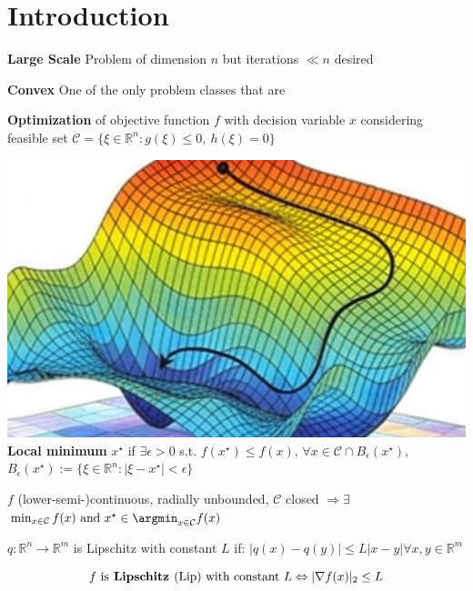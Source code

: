\section{Introduction}

\textbf{Large Scale}
Problem of dimension $n$ but iterations $\ll n$ desired

\textbf{Convex}
One of the only problem classes that are 

\textbf{Optimization}
of objective function $f$ with decision variable $x$
considering feasible set $\mathcal{C} = \{\xi \in \mathbb{R}^{n}: g(\xi)\le0,\ h(\xi)=0\}$

\includegraphics[width=\columnwidth]{images/head-image.jpg}
\textbf{Local minimum}
$x^\star$ if $\exists\epsilon>0$ s.t. $f(x^\star)\leq f(x)$,
$\forall x \in \mathcal{C} \cap B_\epsilon(x^\star)$,
$B_\epsilon(x^\star):=\{\xi\in\mathbb{R}^{n}:|\xi-x^\star|<\epsilon\}$


\begin{proposition}
	$f$ (lower-semi-)continuous,
	radially unbounded,
	$\mathcal{C}$ closed
	$\Rightarrow\exists$
	$	\min_{x \in \mathcal{C}} f(x)\ \text{and}\ x^\star\in\argmin_{x \in \mathcal{C}}f(x)$
\end{proposition}


\begin{definition}
	$q: \mathbb{R}^{n} \rightarrow \mathbb{R}^{m}$
	is Lipschitz with constant $L$ if:
	$|q(x)-q(y)| \le L |x-y| \forall x,y \in \mathbb{R}^{m}$
\end{definition}
\vspace{-4mm}
$$f \text{ is\textbf{ Lipschitz }(Lip) with constant } L
	\Leftrightarrow
	|\nabla f(x)|_2\le L$$
\vspace{-4mm}

